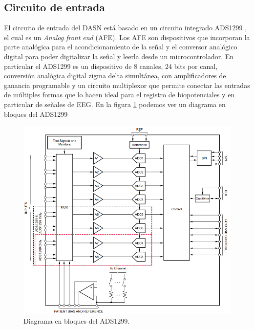 \subsection{Circuito de entrada}
El circuito de entrada del DASN está basado en un circuito integrado ADS1299 \citep{REF}, el cual es un \textit{Analog front end} (AFE). Los AFE son dispositivos que incorporan la parte analógica para el acondicionamiento de la señal y el conversor analógico digital para poder digitalizar la señal y leerla desde un microcontrolador. En particular el ADS1299 es un dispositivo de 8 canales, 24 bits por canal, conversión analógica digital zigma delta simultánea, con amplificadores de ganancia programable y un circuito multiplexor que permite conectar las entradas de múltiples formas que lo hacen ideal para el registro de biopotenciales y en particular de señales de EEG. En la figura \ref{fig:diagBloquesADS1299} podemos ver un diagrama en bloques del ADS1299

\vspace{1cm}

\begin{figure}[htbp]
	\centering
	\includegraphics[width=1\textwidth]{./Figures/DiagramaEnBloquesADS1299.png}
	\caption{Diagrama en bloques del ADS1299.}
	\label{fig:diagBloquesADS1299}
\end{figure}

\vspace{1cm}

